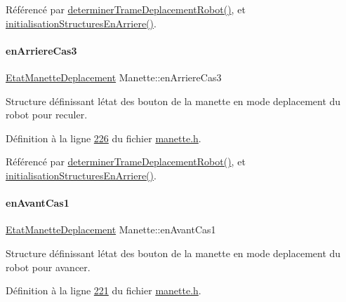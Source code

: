 Référencé par \hyperlink{manette_8cpp_source_l00341}{determiner\+Trame\+Deplacement\+Robot()}, et \hyperlink{manette_8cpp_source_l00127}{initialisation\+Structures\+En\+Arriere()}.

\mbox{\label{class_manette_a2dfc47df38251abd34a495005eae6572}} 
\paragraph{\texorpdfstring{en\+Arriere\+Cas3}{enArriereCas3}}
{\footnotesize\ttfamily \hyperlink{struct_etat_manette_deplacement}{Etat\+Manette\+Deplacement} Manette\+::en\+Arriere\+Cas3\hspace{0.3cm}{\ttfamily [private]}}



Structure définissant l\textquotesingle{}état des bouton de la manette en mode deplacement du robot pour reculer. 



Définition à la ligne \hyperlink{manette_8h_source_l00226}{226} du fichier \hyperlink{manette_8h_source}{manette.\+h}.



Référencé par \hyperlink{manette_8cpp_source_l00341}{determiner\+Trame\+Deplacement\+Robot()}, et \hyperlink{manette_8cpp_source_l00127}{initialisation\+Structures\+En\+Arriere()}.

\mbox{\label{class_manette_ad6d8777e6a4885b343389a04174cf1c9}} 
\paragraph{\texorpdfstring{en\+Avant\+Cas1}{enAvantCas1}}
{\footnotesize\ttfamily \hyperlink{struct_etat_manette_deplacement}{Etat\+Manette\+Deplacement} Manette\+::en\+Avant\+Cas1\hspace{0.3cm}{\ttfamily [private]}}



Structure définissant l\textquotesingle{}état des bouton de la manette en mode deplacement du robot pour avancer. 



Définition à la ligne \hyperlink{manette_8h_source_l00221}{221} du fichier \hyperlink{manette_8h_source}{manette.\+h}.



